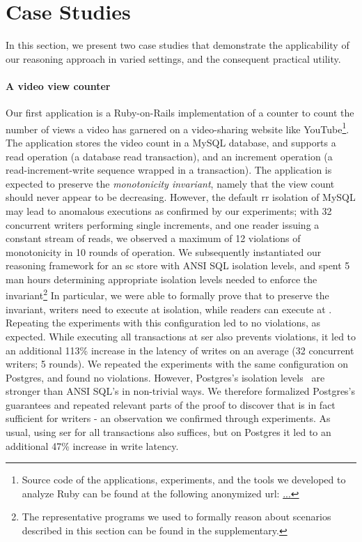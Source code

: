 \section{Case Studies}
\label{sec:case-studies}

In this section, we present two case studies that demonstrate the
applicability of our reasoning approach in varied settings, and the
consequent practical utility.

\paragraph{A video view counter} Our first application is a
Ruby-on-Rails implementation of a counter to count the number of views
a video has garnered on a video-sharing website like
YouTube\footnote{Source code of the applications, experiments, and the
tools we developed to analyze Ruby can be found at the following
anonymized url: \url{...}}. The application stores the video count in
a MySQL database, and supports a read operation (a database read
transaction), and an increment operation (a read-increment-write
sequence wrapped in a transaction). The application is expected to
preserve the \emph{monotonicity invariant}, namely that the view count
should never appear to be decreasing. However, the default {\sc rr}
isolation of MySQL may lead to anomalous executions as confirmed by
our experiments; with 32 concurrent writers performing single
increments, and one reader issuing a constant stream of reads, we
observed a maximum of 12 violations of monotonicity in 10 rounds of
operation. We subsequently instantiated our reasoning framework for an
{\sc sc} store with ANSI SQL isolation levels, and spent 5 man hours
determining appropriate isolation levels needed to enforce the
invariant\footnote{The representative \txnimp programs we used to
formally reason about scenarios described in this section can be found
in the supplementary.} In particular, we were able to formally prove
that to preserve the invariant, writers need to execute at
 isolation, while readers can execute at . Repeating the experiments with this configuration led to
no violations, as expected. While executing all transactions at {\sc
ser} also prevents violations, it led to an additional 113\% increase
in the latency of writes on an average (32 concurrent writers; 5
rounds). We repeated the experiments with the same configuration on
Postgres, and found no violations. However, Postgres's isolation
levels~\cite{postgresiso} are stronger than ANSI SQL's in non-trivial
ways. We therefore formalized Postgres's guarantees and repeated
relevant parts of the proof to discover that  is
in fact sufficient for writers - an observation we confirmed through
experiments. As usual, using {\sc ser} for all transactions also
suffices, but on Postgres it led to an additional 47\% increase in
write latency.

